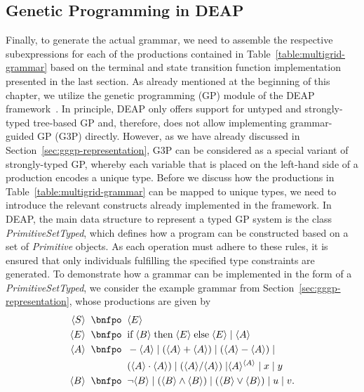 \subsection{Genetic Programming in DEAP}
\label{sec:evostencils-part1:productions}
Finally, to generate the actual grammar, we need to assemble the respective subexpressions for each of the productions contained in Table~\ref{table:multigrid-grammar} based on the terminal and state transition function implementation presented in the last section.
As already mentioned at the beginning of this chapter, we utilize the genetic programming (GP) module of the DEAP framework~\cite{rainville2012deap}. 
In principle, DEAP only offers support for untyped and strongly-typed tree-based GP and, therefore, does not allow implementing grammar-guided GP (G3P) directly.
However, as we have already discussed in Section~\ref{sec:gggp-representation}, G3P can be considered as a special variant of strongly-typed GP, whereby each variable that is placed on the left-hand side of a production encodes a unique type.
Before we discuss how the productions in Table~\ref{table:multigrid-grammar} can be mapped to unique types, we need to introduce the relevant constructs already implemented in the framework.
In DEAP, the main data structure to represent a typed GP system is the class \emph{PrimitiveSetTyped}, which defines how a program can be constructed based on a set of \emph{Primitive} objects.
As each operation must adhere to these rules, it is ensured that only individuals fulfilling the specified type constraints are generated.
To demonstrate how a grammar can be implemented in the form of a \emph{PrimitiveSetTyped}, we consider the example grammar from Section~\ref{sec:gggp-representation}, whose productions are given by
\begin{equation*}
	\begin{split}
		\ps S \; \; \bnfpo & \; \; \ps E \\
		\ps E \; \; \bnfpo & \; \; \text{if} \; \ps B \; \text{then} \; \ps E \; \text{else} \; \ps E \; | \; \ps A \\
		\ps A \; \; \bnfpo & \; \; -\ps A \; | \; (\ps A + \ps A) \; | \; (\ps A - \ps A) \; | \\
		& \; \; (\ps A \cdot \ps A) \; | \; (\ps A / \ps A) \; | \ps{A}^{\ps{A}} \; | \; x \; | \; y \\  
		\ps B \; \; \bnfpo & \; \;  \neg \ps B \; | \; (\ps B \wedge \ps B) \; | \; (\ps B \vee \ps B) \; | \; u \; | \; v.
	\end{split}
\end{equation*}
